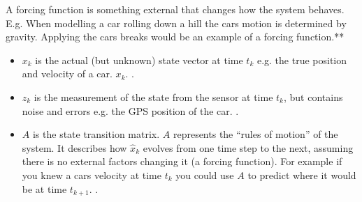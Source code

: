 \documentclass[letterpaper,10pt,english]{jupyterBook}
\begin{document}
\begin{sphinxShadowBox}
\sphinxstylesidebartitle{}

\sphinxAtStartPar
A forcing function is something external that  changes how the system behaves. E.g. When modelling a car rolling down a hill the cars motion is determined by gravity. Applying the cars breaks would be an example of a forcing function.**
\end{sphinxShadowBox}
\begin{itemize}
\item {} 
\sphinxAtStartPar
\(x_k\) is the actual (but unknown) state vector at time \(t_k\) e.g. the true position and velocity of a car. \(x_k\). .

\item {} 
\sphinxAtStartPar
\(z_k\) is the measurement of the state from the sensor at time \(t_k\), but contains noise and errors e.g. the GPS position of the car. .

\item {} 
\sphinxAtStartPar
\(A\) is the state transition matrix. \(A\) represents the “rules of motion” of the system. It describes how \(\hat{x}_k\) evolves from one time step to the next, assuming there is no external factors changing it (a forcing function). For example if you knew a cars velocity at time \(t_k\) you could use \(A\) to predict where it would be at time \(t_{k+1}\). .

\end{itemize}
\end{document}
